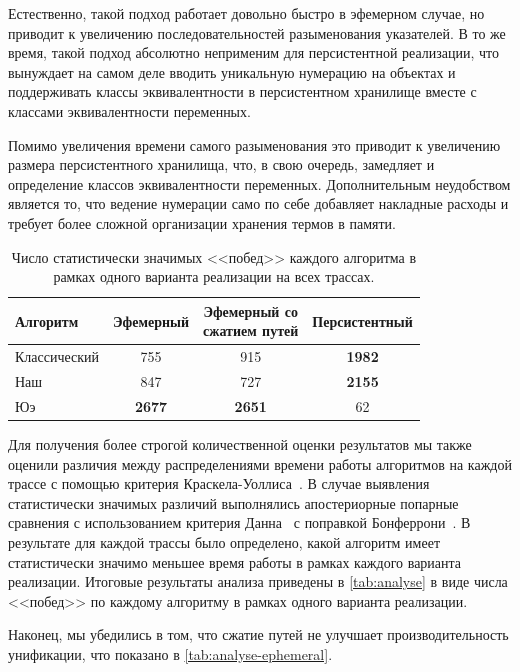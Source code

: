 Естественно, такой подход работает довольно быстро в эфемерном случае, но приводит к увеличению последовательностей разыменования указателей. В то же время, такой подход абсолютно неприменим для персистентной реализации, что вынуждает на самом деле вводить уникальную нумерацию на объектах и поддерживать классы эквивалентности в персистентном хранилище вместе с классами эквивалентности переменных.

Помимо увеличения времени самого разыменования это приводит к увеличению размера персистентного хранилища, что, в свою очередь, замедляет и определение классов эквивалентности переменных. Дополнительным неудобством является то, что ведение нумерации само по себе добавляет накладные расходы и требует более сложной организации хранения термов в памяти.

\begin{table}[h!]
    \centering
    \begin{tabular}{l||c|c|c}
        \toprule
        \bf Алгоритм & \bf Эфемерный & \bf\makecell{Эфемерный со \\ сжатием путей} & \bf Персистентный \\
        \midrule
        Классический & 755 & 915 & \bf 1982 \\
        Наш & 847 & 727 & \bf 2155 \\
        Юэ & \bf 2677 & \bf 2651 & 62 \\
        \bottomrule
    \end{tabular}
    \caption{Число статистически значимых <<побед>> каждого алгоритма в рамках одного варианта реализации на всех трассах.}
    \label{tab:analyse}
\end{table}

Для получения более строгой количественной оценки результатов мы также оценили различия между распределениями времени работы алгоритмов на каждой трассе с помощью критерия Краскела-Уоллиса~\cite{kruskal1952use}. В случае выявления статистически значимых различий выполнялись апостериорные попарные сравнения с использованием критерия Данна~\cite{dunn1964multiple} с поправкой Бонферрони~\cite{bonferroni1936teoria}. В результате для каждой трассы было определено, какой алгоритм имеет статистически значимо меньшее время работы в рамках каждого варианта реализации. Итоговые результаты анализа приведены в \autoref{tab:analyse} в виде числа <<побед>> по каждому алгоритму в рамках одного варианта реализации.

Наконец, мы убедились в том, что сжатие путей не улучшает производительность унификации, что показано в \autoref{tab:analyse-ephemeral}.

